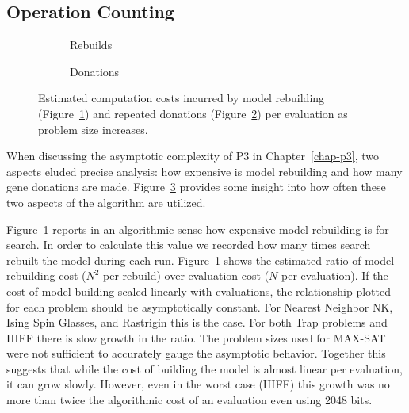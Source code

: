 \subsection{Operation Counting}
\begin{figure}[t]
  \begin{centering}
    \begin{subfigure}{.5\textwidth}
      \begin{centering}
      \end{centering}
      \caption{Rebuilds}
      \label{fig-rebuilds}
    \end{subfigure}%
    \begin{subfigure}{.5\textwidth}
      \begin{centering}
      \end{centering}
      \caption{Donations}
      \label{fig-donations}
    \end{subfigure}
  \end{centering}
  \caption{Estimated computation costs incurred by model rebuilding (Figure~\ref{fig-rebuilds}) and
           repeated donations (Figure~\ref{fig-donations}) per evaluation as problem size increases.}
  \label{fig-costs}
\end{figure}

When discussing the asymptotic complexity of P3 in Chapter~\ref{chap-p3}, two aspects eluded precise
analysis: how expensive is model rebuilding and how many gene donations are made. Figure~\ref{fig-costs}
provides some insight into how often these two aspects of the algorithm are utilized.

Figure~\ref{fig-rebuilds} reports in an algorithmic sense how expensive model rebuilding is for search.
In order to calculate this value we recorded how many times search rebuilt the model during each run.
Figure~\ref{fig-rebuilds} shows the estimated ratio of model rebuilding cost ($N^2$ per rebuild) over evaluation cost ($N$ per evaluation).
If the cost of model building
scaled linearly with evaluations, the relationship plotted for each problem should be asymptotically constant.
For Nearest Neighbor NK, Ising Spin Glasses, and Rastrigin this is the case. For both Trap problems
and HIFF there is slow growth in the ratio. The problem sizes used for MAX-SAT were not sufficient
to accurately gauge the asymptotic behavior. Together this suggests that while the cost of building the model
is almost linear per evaluation, it can grow slowly. However, even in the worst case (HIFF) this growth was
no more than twice the algorithmic cost of an evaluation even using 2048 bits.

